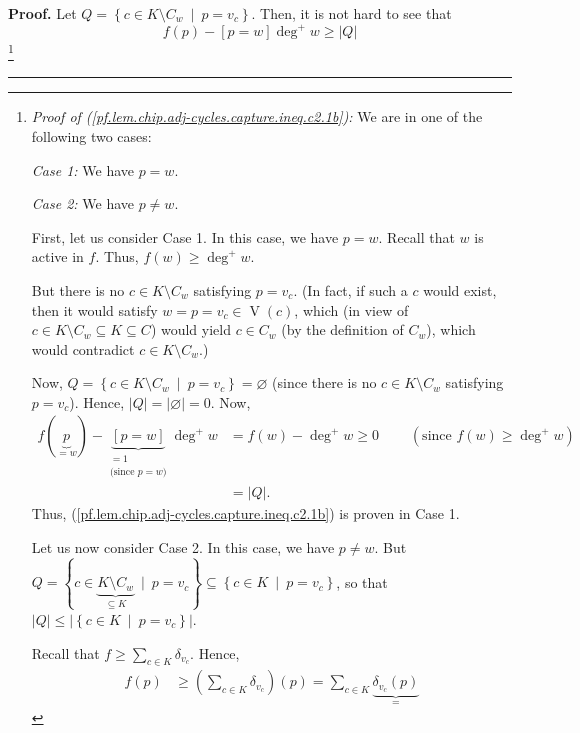 \documentclass[numbers=enddot,12pt,final,onecolumn,notitlepage]{scrartcl}%
\theoremstyle{definition}
\newenvironment{proof}[1][Proof]{\noindent\textbf{#1.} }{\ \rule{0.5em}{0.5em}}
\let\sumnonlimits\sum
\renewcommand{\sum}{\sumnonlimits\limits}
\begin{document}
\begin{proof}
Let $Q=\left\{  c\in K\setminus C_{w}\ \mid\ p=v_{c}\right\}  $. Then, it is
not hard to see that%
\begin{equation}
f\left(  p\right)  -\left[  p=w\right]  \deg^{+}w\geq\left\vert Q\right\vert
\label{pf.lem.chip.adj-cycles.capture.ineq.c2.1b}%
\end{equation}
\footnote{\textit{Proof of (\ref{pf.lem.chip.adj-cycles.capture.ineq.c2.1b}):}
We are in one of the following two cases:
\par
\textit{Case 1:} We have $p=w$.
\par
\textit{Case 2:} We have $p\neq w$.
\par
First, let us consider Case 1. In this case, we have $p=w$. Recall that $w$ is
active in $f$. Thus, $f\left(  w\right)  \geq\deg^{+}w$.
\par
But there is no $c\in K\setminus C_{w}$ satisfying $p=v_{c}$. (In fact, if
such a $c$ would exist, then it would satisfy $w=p=v_{c}\in\operatorname*{V}%
\left(  c\right)  $, which (in view of $c\in K\setminus C_{w}\subseteq
K\subseteq C$) would yield $c\in C_{w}$ (by the definition of $C_{w}$), which
would contradict $c\in K\setminus C_{w}$.)
\par
Now, $Q=\left\{  c\in K\setminus C_{w}\ \mid\ p=v_{c}\right\}  =\varnothing$
(since there is no $c\in K\setminus C_{w}$ satisfying $p=v_{c}$). Hence,
$\left\vert Q\right\vert =\left\vert \varnothing\right\vert =0$. Now,%
\begin{align*}
f\left(  \underbrace{p}_{=w}\right)  -\underbrace{\left[  p=w\right]
}_{\substack{=1\\\text{(since }p=w\text{)}}}\deg^{+}w  & =f\left(  w\right)
-\deg^{+}w\geq0\ \ \ \ \ \ \ \ \ \ \left(  \text{since }f\left(  w\right)
\geq\deg^{+}w\right)  \\
& =\left\vert Q\right\vert .
\end{align*}
Thus, (\ref{pf.lem.chip.adj-cycles.capture.ineq.c2.1b}) is proven in Case 1.
\par
Let us now consider Case 2. In this case, we have $p\neq w$. But $Q=\left\{
c\in\underbrace{K\setminus C_{w}}_{\subseteq K}\ \mid\ p=v_{c}\right\}
\subseteq\left\{  c\in K\ \mid\ p=v_{c}\right\}  $, so that $\left\vert
Q\right\vert \leq\left\vert \left\{  c\in K\ \mid\ p=v_{c}\right\}
\right\vert $.
\par
Recall that $f\geq\sum_{c\in K}\delta_{v_{c}}$. Hence,%
\begin{align*}
f\left(  p\right)   &  \geq\left(  \sum_{c\in K}\delta_{v_{c}}\right)  \left(
p\right)  =\sum_{c\in K}\underbrace{\delta_{v_{c}}\left(  p\right)  }_{=%
}
\end{align*}}
\end{proof}
\end{document}
